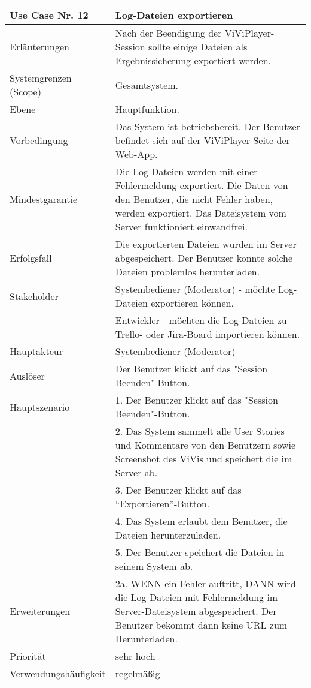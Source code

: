 \begin{tabularx}{\linewidth}{|l|X|}
	\hline
	Use Case Nr. 12			& \textbf{Log-Dateien exportieren} \\ \hline
	Erläuterungen			& Nach der Beendigung der ViViPlayer-Session sollte einige Dateien
							  als Ergebnissicherung exportiert werden.\\ \hline
	Systemgrenzen (Scope)	& Gesamtsystem. \\ \hline
	Ebene					& Hauptfunktion. \\ \hline
	Vorbedingung			& Das System ist betriebsbereit. Der Benutzer befindet sich auf der 
							  ViViPlayer-Seite der Web-App. \\ \hline
	Mindestgarantie			& Die Log-Dateien werden mit einer Fehlermeldung exportiert. Die 
							  Daten von den Benutzer, die nicht Fehler haben, werden exportiert. Das Dateisystem vom Server funktioniert einwandfrei.\\ \hline
	Erfolgsfall				& Die exportierten Dateien wurden im Server abgespeichert. Der 
							  Benutzer konnte solche Dateien problemlos herunterladen. \\ \hline
	Stakeholder				& Systembediener (Moderator) - möchte Log-Dateien exportieren 
							  können.\\ 
							& Entwickler - möchten die Log-Dateien zu Trello- oder Jira-Board 
							  importieren können. \\ \hline
	Hauptakteur				& Systembediener (Moderator) \\ \hline
	Auslöser				& Der Benutzer klickt auf das "Session Beenden"-Button. \\ \hline	
	Hauptszenario			& 1. Der Benutzer klickt auf das "Session Beenden"-Button. \\
							& 2. Das System sammelt alle User Stories und Kommentare von den 
							  Benutzern sowie Screenshot des ViVis und speichert die im Server 
							  ab. \\
							& 3. Der Benutzer klickt auf das ``Exportieren''-Button. \\
							& 4. Das System erlaubt dem Benutzer, die Dateien herunterzuladen. \\
							& 5. Der Benutzer speichert die Dateien in seinem System ab. 
							  \\ \hline
	Erweiterungen			& 2a. WENN ein Fehler auftritt, DANN wird die Log-Dateien mit 
							  Fehlermeldung im Server-Dateisystem abgespeichert. Der Benutzer bekommt dann keine URL zum Herunterladen. \\ \hline
	Priorität				& sehr hoch \\ \hline
	Verwendungshäufigkeit	& regelmäßig \\ \hline
\end{tabularx}

